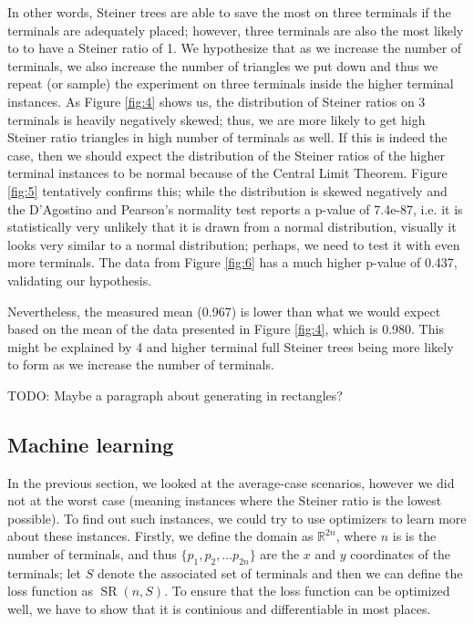 \documentclass{mpaper}
\begin{document}
In other words, Steiner trees are able to save the most on three terminals if the terminals are adequately placed; however, three terminals are also the most likely to to have a Steiner ratio of 1. We hypothesize that as we increase the number of terminals, we also increase the number of triangles we put down and thus we repeat (or sample) the experiment on three terminals inside the higher terminal instances. As Figure \ref{fig:4} shows us, the distribution of Steiner ratios on 3 terminals is heavily negatively skewed; thus, we are more likely to get high Steiner ratio triangles in high number of terminals as well. If this is indeed the case, then we should expect the distribution of the Steiner ratios of the higher terminal instances to be normal because of the Central Limit Theorem. Figure \ref{fig:5} tentatively confirms this; while the distribution is skewed negatively and the D'Agostino and Pearson's normality test reports a p-value of 7.4e-87, i.e. it is statistically very unlikely that it is drawn from a normal distribution, visually it looks very similar to a normal distribution; perhaps, we need to test it with even more terminals. The data from Figure \ref{fig:6} has a much higher p-value of 0.437, validating our hypothesis.

Nevertheless, the measured mean (0.967) is lower than what we would expect based on the mean of the data presented in Figure \ref{fig:4}, which is 0.980. This might be explained by 4 and higher terminal full Steiner trees being more likely to form as we increase the number of terminals. 

TODO: Maybe a paragraph about generating in rectangles?

\subsection{Machine learning}


In the previous section, we looked at the average-case scenarios, however we did not at the worst case (meaning instances where the Steiner ratio is the lowest possible). To find out such instances, we could try to use optimizers to learn more about these instances. Firstly, we define the domain as $\mathbb{R}^{2n}$, where $n$ is is the number of terminals, and thus $\{p_1, p_2, \dots p_{2n}\}$ are the $x$ and $y$ coordinates of the terminals; let $S$ denote the associated set of terminals and then we can define the loss function as $\operatorname{SR}(n, S)$. To ensure that the loss function can be optimized well, we have to show that it is continious and differentiable in most places.
\end{document}
